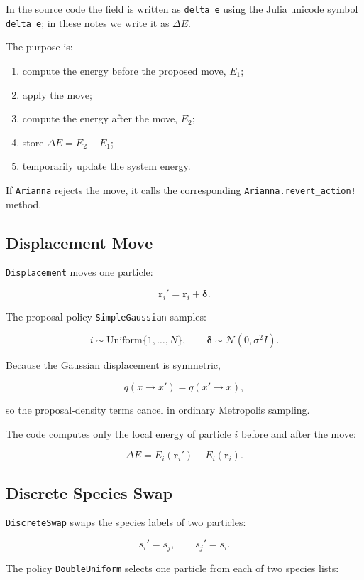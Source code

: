 \documentclass[11pt]{article}
\begin{document}
In the source code the field is written as \texttt{delta e} using the Julia
unicode symbol \texttt{delta e}; in these notes we write it as \(\Delta E\).

The purpose is:

\begin{enumerate}[nosep]
  \item compute the energy before the proposed move, \(E_1\);
  \item apply the move;
  \item compute the energy after the move, \(E_2\);
  \item store \(\Delta E = E_2 - E_1\);
  \item temporarily update the system energy.
\end{enumerate}

If \texttt{Arianna} rejects the move, it calls the corresponding
\texttt{Arianna.revert\_action!} method.

\subsection{Displacement Move}

\texttt{Displacement} moves one particle:

\[
\mathbf{r}_i' = \mathbf{r}_i + \boldsymbol{\delta}.
\]

The proposal policy \texttt{SimpleGaussian} samples:

\[
i \sim \mathrm{Uniform}\{1,\dots,N\},
\qquad
\boldsymbol{\delta} \sim \mathcal{N}(0,\sigma^2 I).
\]

Because the Gaussian displacement is symmetric,

\[
q(x\to x') = q(x'\to x),
\]

so the proposal-density terms cancel in ordinary Metropolis sampling.

The code computes only the local energy of particle \(i\) before and after the
move:

\[
\Delta E = E_i(\mathbf{r}_i') - E_i(\mathbf{r}_i).
\]

\subsection{Discrete Species Swap}

\texttt{DiscreteSwap} swaps the species labels of two particles:

\[
s_i' = s_j,
\qquad
s_j' = s_i.
\]

The policy \texttt{DoubleUniform} selects one particle from each of two species
lists:
\end{document}
